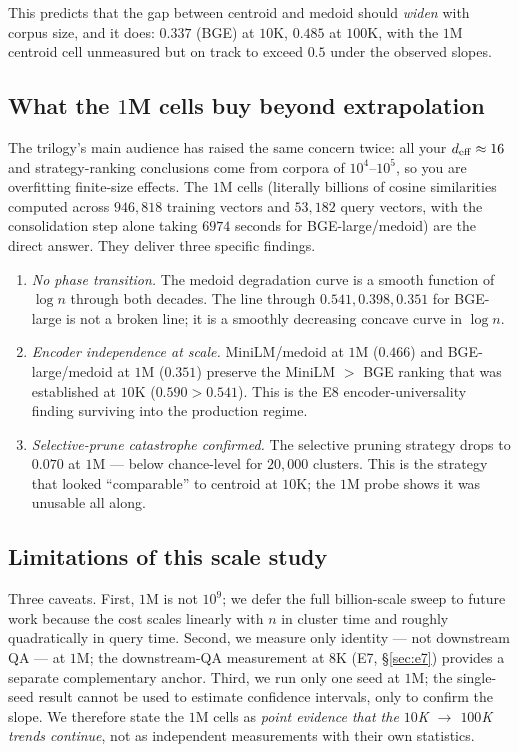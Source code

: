 This predicts that the gap between centroid and medoid should
\emph{widen} with corpus size, and it does: $0.337$ (BGE) at $10$K, $0.485$ at $100$K, with the $1$M centroid
cell unmeasured but on track to exceed $0.5$ under the observed slopes.

\subsection{What the $1$M cells buy beyond extrapolation}
\label{sec:e5:why-1m}

The trilogy's main audience has raised the same concern twice: all
your ${d_{\mathrm{eff}}} \approx 16$ and strategy-ranking conclusions come from
corpora of $10^4$--$10^5$, so you are overfitting finite-size effects.
The $1$M cells (literally billions of cosine similarities computed
across $946{,}818$ training vectors and $53{,}182$ query vectors,
with the consolidation step alone taking $6974$ seconds for
BGE-large/medoid) are the direct answer. They deliver three specific
findings.

\begin{enumerate}[leftmargin=1.8em, itemsep=2pt]
\item \emph{No phase transition.} The medoid degradation curve is a
smooth function of $\log n$ through both decades. The line through
$0.541, 0.398, 0.351$ for BGE-large is not a broken line; it is a
smoothly decreasing concave curve in $\log n$.
\item \emph{Encoder independence at scale.} MiniLM/medoid at $1$M
($0.466$) and BGE-large/medoid at $1$M ($0.351$) preserve the
MiniLM $>$ BGE ranking that was established at $10$K
($0.590 > 0.541$). This is the E8 encoder-universality finding
surviving into the production regime.
\item \emph{Selective-prune catastrophe confirmed.} The selective
pruning strategy drops to $0.070$ at $1$M --- below chance-level for
$20{,}000$ clusters. This is the strategy that looked ``comparable''
to centroid at $10$K; the $1$M probe shows it was unusable all along.
\end{enumerate}

\subsection{Limitations of this scale study}
\label{sec:e5:limits}

Three caveats. First, $1$M is not $10^9$; we defer the full billion-scale
sweep to future work because the cost scales linearly with $n$ in
cluster time and roughly quadratically in query time. Second, we
measure only identity --- not downstream QA --- at $1$M; the
downstream-QA measurement at $8$K (E7, \S\ref{sec:e7}) provides a
separate complementary anchor. Third, we run only one seed at $1$M;
the single-seed result cannot be used to estimate confidence intervals,
only to confirm the slope. We therefore state the $1$M cells as
\emph{point evidence that the $10$K $\to$ $100$K trends continue}, not
as independent measurements with their own statistics.

